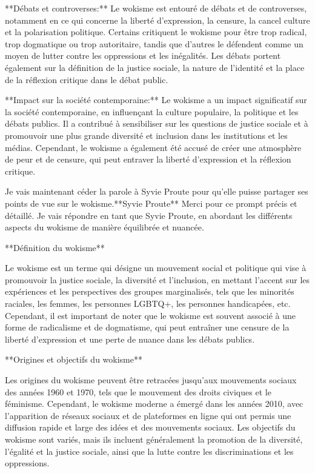 **Débats et controverses:**
Le wokisme est entouré de débats et de controverses, notamment en ce qui concerne la liberté d'expression, la censure, la cancel culture et la polarisation politique. Certains critiquent le wokisme pour être trop radical, trop dogmatique ou trop autoritaire, tandis que d'autres le défendent comme un moyen de lutter contre les oppressions et les inégalités. Les débats portent également sur la définition de la justice sociale, la nature de l'identité et la place de la réflexion critique dans le débat public.

**Impact sur la société contemporaine:**
Le wokisme a un impact significatif sur la société contemporaine, en influençant la culture populaire, la politique et les débats publics. Il a contribué à sensibiliser sur les questions de justice sociale et à promouvoir une plus grande diversité et inclusion dans les institutions et les médias. Cependant, le wokisme a également été accusé de créer une atmosphère de peur et de censure, qui peut entraver la liberté d'expression et la réflexion critique.

Je vais maintenant céder la parole à Syvie Proute pour qu'elle puisse partager ses points de vue sur le wokisme.**Syvie Proute**
Merci pour ce prompt précis et détaillé. Je vais répondre en tant que Syvie Proute, en abordant les différents aspects du wokisme de manière équilibrée et nuancée.

**Définition du wokisme**

Le wokisme est un terme qui désigne un mouvement social et politique qui vise à promouvoir la justice sociale, la diversité et l'inclusion, en mettant l'accent sur les expériences et les perspectives des groupes marginalisés, tels que les minorités raciales, les femmes, les personnes LGBTQ+, les personnes handicapées, etc. Cependant, il est important de noter que le wokisme est souvent associé à une forme de radicalisme et de dogmatisme, qui peut entraîner une censure de la liberté d'expression et une perte de nuance dans les débats publics.

**Origines et objectifs du wokisme**

Les origines du wokisme peuvent être retracées jusqu'aux mouvements sociaux des années 1960 et 1970, tels que le mouvement des droits civiques et le féminisme. Cependant, le wokisme moderne a émergé dans les années 2010, avec l'apparition de réseaux sociaux et de plateformes en ligne qui ont permis une diffusion rapide et large des idées et des mouvements sociaux. Les objectifs du wokisme sont variés, mais ils incluent généralement la promotion de la diversité, l'égalité et la justice sociale, ainsi que la lutte contre les discriminations et les oppressions.

